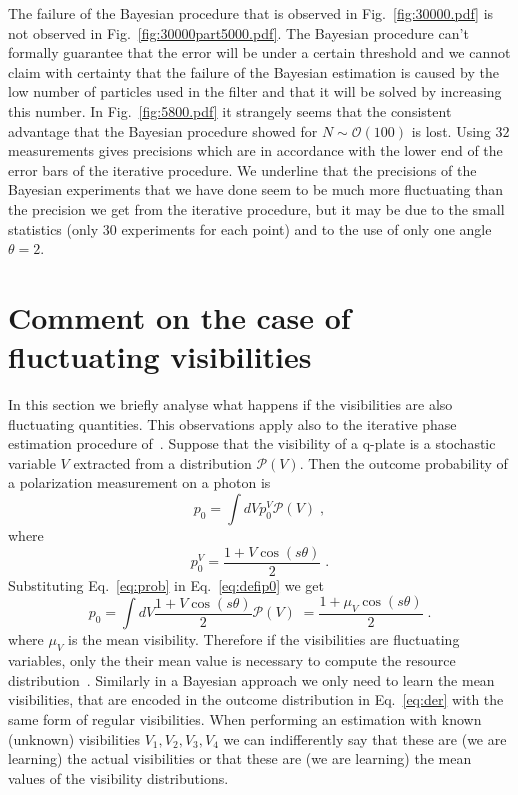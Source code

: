 \documentclass[aps, pra, 10pt, twocolumn, superscriptaddress,floatfix]{revtex4-1}
\begin{document}
%
The failure of the Bayesian procedure that is observed in Fig.~\ref{fig:30000.pdf} is not observed in Fig.~\ref{fig:30000part5000.pdf}. The Bayesian procedure can't formally guarantee that the error will be under a certain threshold and we cannot claim with certainty that the failure of the Bayesian estimation is caused by the low number of particles used in the filter and that it will be solved by increasing this number. In Fig.~\ref{fig:5800.pdf} it strangely seems that the consistent advantage that the Bayesian procedure showed for $N \sim \mathcal{O} (100)$ is lost. Using $32$ measurements gives precisions which are in accordance with the lower end of the error bars of the iterative procedure. We underline that the precisions of the Bayesian experiments that we have done seem to be much more fluctuating than the precision we get from the iterative procedure, but it may be due to the small statistics (only $30$ experiments for each point) and to the use of only one angle $\theta = 2$.
%

\section{Comment on the case of fluctuating visibilities}
\label{sec:fluctVisibilities}
%
In this section we briefly analyse what happens if the visibilities are also fluctuating quantities. This observations apply also to the iterative phase estimation procedure of~\cite{Cimini2021}. Suppose that the visibility of a q-plate is a stochastic variable $V$ extracted from a distribution $\mathcal{P} (V)$. Then the outcome probability of a polarization measurement on a photon is
%
\begin{equation}
	p_0 = \int dV p_0^V \mathcal{P} (V) \; ,
	\label{eq:defip0}
\end{equation}
%
where 
%
\begin{equation}
	p_0^V = \frac{1+V \cos(s \theta)}{2} \; .
	\label{eq:prob}
\end{equation}
%
Substituting Eq.~\eqref{eq:prob} in Eq.~\eqref{eq:defip0} we get
%
\begin{equation}
	p_0 = \int dV \frac{1+V \cos(s \theta)}{2} \mathcal{P} (V) \;  = \frac{1 + \mu_V \cos(s \theta)}{2} \; .
	\label{eq:der}
\end{equation}
%
where $\mu_V$ is the mean visibility. Therefore if the visibilities are fluctuating variables, only the their mean value is necessary to compute the resource distribution~\cite{Cimini2021}. Similarly in a Bayesian approach we only need to learn the mean visibilities, that are encoded in the outcome distribution in Eq.~\eqref{eq:der} with the same form of regular visibilities. When performing an estimation with known (unknown) visibilities $V_1, V_2, V_3, V_4$ we can indifferently say that these are (we are learning) the actual visibilities or that these are (we are learning) the mean values of the visibility distributions. 
\end{document}
